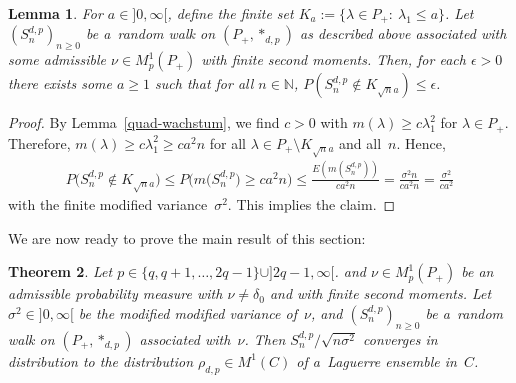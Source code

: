 \documentclass[pdftex]{sigma}
\numberwithin{equation}{section}
\newtheorem{Theorem}{Theorem}[section]
\newtheorem{Lemma}[Theorem]{Lemma}
\begin{document}
\begin{Lemma}
\label{sn-wachstum}
For $a\in{}]0,\infty[$, define the finite set $K_a:=\{\lambda\in P_+:\> \lambda_1\le a\}$.
Let $(S_n^{d,p})_{n\ge0}$ be a~random walk on $(P_+,*_{d,p})$ as described above associated with some admissible $\nu\in
M^1_p(P_+)$ with finite second moments.
Then, for each $\epsilon>0$ there exists some $a\ge1$ such that for all $n\in\mathbb N$, $P(S_n^{d,p}\not\in K_{\sqrt
n  a})\le\epsilon$.
\end{Lemma}

\begin{proof}
By Lemma~\ref{quad-wachstum}, we f\/ind $c>0$ with $m(\lambda)\ge c\lambda_1^2$ for $\lambda\in P_+$.
Therefore, $m(\lambda)\ge c\lambda_1^2\ge ca^2n$ for all $\lambda\in P_+\setminus K_{\sqrt n  a}$ and all~$n$.
Hence,
\begin{gather*}
P\big(S_n^{d,p}\not\in K_{\sqrt n  a}\big)  \le  P\big(m\big(S_n^{d,p}\big)\ge ca^2n\big)   \le   \frac{E(m(S_n^{d,p}))}{ca^2n}
 = \frac{\sigma^2n}{ca^2n}=\frac{\sigma^2}{ca^2}
\end{gather*}
with the f\/inite modif\/ied variance~$\sigma^2$.
This implies the claim.
\end{proof}

We are now ready to prove the main result of this section:

\begin{Theorem}\label{clt}
Let $p\in \{q,q+1,\ldots,2q-1\}\cup]2q-1,\infty[$.
and $\nu\in M^1_p(P_+)$ be an admissible probability measure with $\nu\ne \delta_0$ and with finite second moments.
Let $\sigma^2\in{}]0,\infty[$ be the modified modified variance of~$\nu$, and $(S_n^{d,p})_{n\ge0}$ be a~random walk on
$(P_+,*_{d,p})$ associated with~$\nu$.
Then $ S_n^{d,p}/\sqrt{n\sigma^2}$ converges in distribution to the distribution $\rho_{d,p}\in M^1(C)$ of a~Laguerre
ensemble in~$C$.
\end{Theorem}
\end{document}
